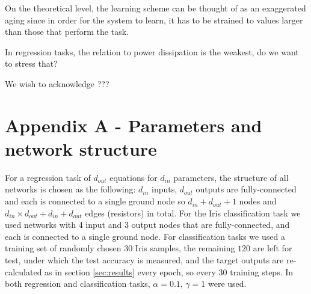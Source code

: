 \documentclass[%
 reprint,
 amsmath,amssymb,
 aps,
]{revtex4-2}
\begin{document}
    On the theoretical level, the learning scheme can be thought of as an exaggerated aging since in order for the system to learn, it has to be strained to values larger than those that perform the task.

    \textcolor{roie}{In regression tasks, the relation to power dissipation is the weakest, do we want to stress that?}


\begin{acknowledgments}
\textcolor{roie}{We wish to acknowledge ???}
\end{acknowledgments}

\appendix

\section{Appendix A - Parameters and network structure}\label{app:net_structure}

For a regression task of $d_{out}$ equations for $d_{in}$ parameters, the structure of all networks is chosen as the following: $d_{in}$ inputs,  $d_{out}$ outputs are fully-connected and each is connected to a single ground node so $d_{in}+d_{out}+1$ nodes and $d_{in}\times d_{out}+d_{in}+d_{out}$ edges (resistors) in total. For the Iris classification task we used networks with $4$ input and $3$ output nodes that are fully-connected, and each is connected to a single ground node. For classification tasks we used a training set of randomly chosen $30$ Iris samples, the remaining $120$ are left for test, under which the test accuracy is measured, and the target outputs are re-calculated as in section \ref{sec:results} every epoch, so every $30$ training steps. In both regression and classification tasks, $\alpha=0.1,\,\gamma=1$ were used.

\nocite{*}

\end{document}
